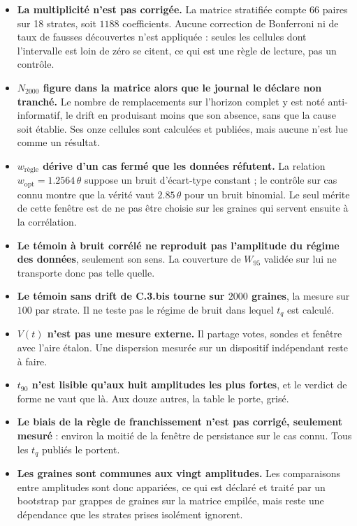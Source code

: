 \documentclass[11pt,a4paper]{article}
\begin{document}
\begin{itemize}
  \item \textbf{La multiplicité n'est pas corrigée.} La matrice stratifiée compte 66 paires
  sur 18 strates, soit $1188$ coefficients. Aucune correction de Bonferroni ni de taux de
  fausses découvertes n'est appliquée : seules les cellules dont l'intervalle est loin de zéro
  se citent, ce qui est une règle de lecture, pas un contrôle.

  \item \textbf{$N_{2000}$ figure dans la matrice alors que le journal le déclare non
  tranché.} Le nombre de remplacements sur l'horizon complet y est noté anti-informatif, le
  drift en produisant moins que son absence, sans que la cause soit établie. Ses onze cellules
  sont calculées et publiées, mais aucune n'est lue comme un résultat.

  \item \textbf{$w_{\text{règle}}$ dérive d'un cas fermé que les données réfutent.} La
  relation $w_{\mathrm{opt}} = 1.2564\,\theta$ suppose un bruit d'écart-type constant ; le
  contrôle sur cas connu montre que la vérité vaut $2.85\,\theta$ pour un bruit binomial. Le
  seul mérite de cette fenêtre est de ne pas être choisie sur les graines qui servent ensuite
  à la corrélation.

  \item \textbf{Le témoin à bruit corrélé ne reproduit pas l'amplitude du régime des
  données}, seulement son sens. La couverture de $W_{95}$ validée sur lui ne transporte donc
  pas telle quelle.

  \item \textbf{Le témoin sans drift de C.3.bis tourne sur $2000$ graines}, la mesure sur
  $100$ par strate. Il ne teste pas le régime de bruit dans lequel $t_q$ est calculé.

  \item \textbf{$V(t)$ n'est pas une mesure externe.} Il partage votes, sondes et fenêtre avec
  l'aire étalon. Une dispersion mesurée sur un dispositif indépendant reste à faire.

  \item \textbf{$t_{90}$ n'est lisible qu'aux huit amplitudes les plus fortes}, et le verdict
  de forme ne vaut que là. Aux douze autres, la table le porte, grisé.

  \item \textbf{Le biais de la règle de franchissement n'est pas corrigé, seulement
  mesuré} : environ la moitié de la fenêtre de persistance sur le cas connu. Tous les $t_q$
  publiés le portent.

  \item \textbf{Les graines sont communes aux vingt amplitudes.} Les comparaisons entre
  amplitudes sont donc appariées, ce qui est déclaré et traité par un bootstrap par grappes de
  graines sur la matrice empilée, mais reste une dépendance que les strates prises isolément
  ignorent.
\end{itemize}
\end{document}

